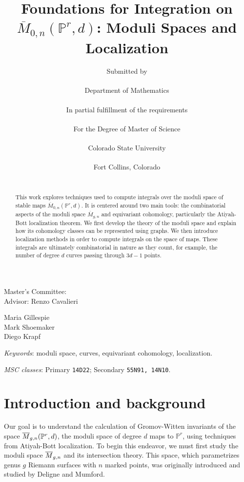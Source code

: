 \documentclass[12pt]{memoir}
\title{Foundations for Integration on $\overline{M}_{0,n}(\mathbb{P}^r,d)$: Moduli Spaces and Localization}
\author{Submitted by \nauthor \\\phantom{WHITE TEXT BOOOO}\\ Department of Mathematics \\\phantom{WHITE TEXT BOOOO}\\ In partial fulfillment of the requirements \\\phantom{WHITE TEXT BOOOO}\\ For the Degree of Master of Science \\\phantom{WHITE TEXT BOOOO}\\ Colorado State University \\\phantom{WHITE TEXT BOOOO}\\ Fort Collins, Colorado\\\phantom{WHITE TEXT BOOOO}\\}
\def\nprofesor {Renzo Cavalieri}
\begin{document}
\maketitle\thispagestyle{empty}
\vfill
\begin{flushleft}
     Master's Committee:\\
        \vspace{1em}
        \hspace{0.25in} Advisor: \nprofesor \par
        \vspace{1em}
        \hspace{0.25in} Maria Gillespie\\
        \hspace{0.25in} Mark Shoemaker\\
        \hspace{0.25in} Diego Krapf
\end{flushleft}
\newpage
\thispagestyle{empty}
\begin{abstract}
     This work explores techniques used to compute integrals over the moduli space of stable maps $\overline{M}_{0,n}(\mathbb{P}^r,d)$. It is centered around two main tools: the combinatorial aspects of the moduli space $\overline{M}_{g,n}$ and equivariant cohomology, particularly the Atiyah-Bott localization theorem.
We first develop the theory of the moduli space and explain how its cohomology classes can be represented using graphs. We then introduce localization methods in order to compute integrals on the space of maps. These integrals are ultimately combinatorial in nature as they count, for example, the number of degree $d$ curves passing through $3d-1$ points.
    \end{abstract}
    
    \begin{flushleft}
    \small
    \emph{Keywords}:
    moduli space, curves, equivariant cohomology, localization.
    
    \emph{MSC classes}:  Primary \texttt{14D22}; Secondary \texttt{55N91, 14N10}.
    \end{flushleft}
\newpage
\tableofcontents

\chapter{Introduction and background}

Our goal is to understand the calculation of Gromov-Witten invariants of the space $\overline{M}_{g,n}(\mathbb{P}^r,d)$, the moduli space of degree $d$ maps to $\mathbb{P}^r$, using techniques from Atiyah-Bott localization. To begin this endeavor, we must first study the moduli space $\overline{M}_{g,n}$ and its intersection theory. This space, which parametrizes genus $g$ Riemann surfaces with $n$ marked points, was originally introduced and studied by Deligne and Mumford.
\end{document}
